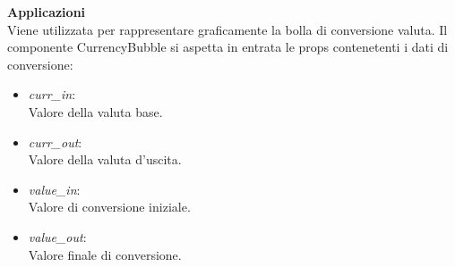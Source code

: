 \textbf{Applicazioni}\\
Viene utilizzata per rappresentare graficamente la bolla di conversione valuta.
Il componente CurrencyBubble si aspetta in entrata le props contenetenti i dati di conversione: \\
\begin{itemize}
\item \textit{curr\_in}:
\\
Valore della valuta base.

\item \textit{curr\_out}:
\\
Valore della valuta d'uscita.

\item \textit{value\_in}:
\\
Valore di conversione iniziale.

\item \textit{value\_out}:
\\
Valore finale di conversione.
\end{itemize} 


\clearpage

